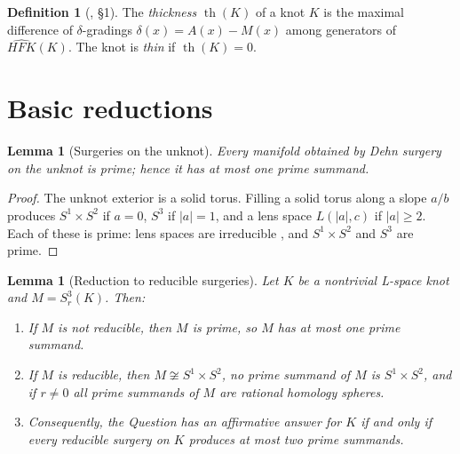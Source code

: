 \documentclass[11pt]{amsart}
\newtheorem{lemma}[theorem]{Lemma}
\theoremstyle{definition}
\newtheorem{definition}[theorem]{Definition}
\theoremstyle{remark}
\numberwithin{equation}{section}
\begin{document}
\begin{definition}[{\cite{ORS}, \S1}]\label{def:thick}
The \emph{thickness} $\operatorname{th}(K)$ of a knot $K$ is the maximal
difference of $\delta$-gradings $\delta(x)=A(x)-M(x)$ among generators of
$\widehat{\mathit{HFK}}(K)$. The knot is \emph{thin} if
$\operatorname{th}(K)=0$.
\end{definition}

\section{Basic reductions}\label{sec:reductions}

\begin{lemma}[Surgeries on the unknot]\label{lem:unknot}
Every manifold obtained by Dehn surgery on the unknot is prime; hence it
has at most one prime summand.
\end{lemma}

\begin{proof}
The unknot exterior is a solid torus. Filling a solid torus along a slope
$a/b$ produces $S^{1}\times S^{2}$ if $a=0$, $S^{3}$ if $|a|=1$, and a lens
space $L(|a|,c)$ if $|a|\ge2$. Each of these is prime: lens spaces are
irreducible \cite[\S5]{Hempel}, and $S^{1}\times S^{2}$ and $S^{3}$ are
prime.
\end{proof}

\begin{lemma}[Reduction to reducible surgeries]\label{lem:reduce}
Let $K$ be a nontrivial L-space knot and $M=S^{3}_{r}(K)$.
Then:
\begin{enumerate}
\item[(a)] If $M$ is not reducible, then $M$ is prime, so $M$ has at most
one prime summand.
\item[(b)] If $M$ is reducible, then $M\not\cong S^{1}\times S^{2}$, no
prime summand of $M$ is $S^{1}\times S^{2}$, and if $r\neq0$ all prime
summands of $M$ are rational homology spheres.
\item[(c)] Consequently, the Question has an affirmative answer for $K$
if and only if every reducible surgery on $K$ produces at most two prime
summands.
\end{enumerate}
\end{lemma}
\end{document}

